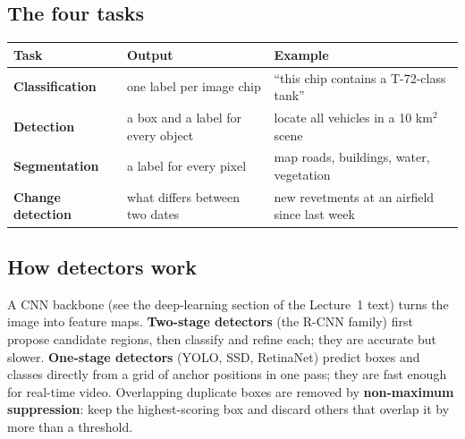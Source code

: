 \documentclass[11pt]{article}
\begin{document}
\subsection{The four tasks}
\begin{center}\small\renewcommand{\arraystretch}{1.3}\begin{tabularx}{\textwidth}{>{\bfseries}l X X}\toprule Task & Output & Example\\\midrule
Classification & one label per image chip & ``this chip contains a T-72-class tank''\\
Detection & a box and a label for every object & locate all vehicles in a 10 km$^2$ scene\\
Segmentation & a label for every pixel & map roads, buildings, water, vegetation\\
Change detection & what differs between two dates & new revetments at an airfield since last week\\\bottomrule\end{tabularx}\end{center}
\subsection{How detectors work}
A CNN backbone (see the deep-learning section of the Lecture~1 text) turns the image into feature maps. \textbf{Two-stage detectors} (the R-CNN family) first propose candidate regions, then classify and refine each; they are accurate but slower. \textbf{One-stage detectors} (YOLO, SSD, RetinaNet) predict boxes and classes directly from a grid of anchor positions in one pass; they are fast enough for real-time video. Overlapping duplicate boxes are removed by \textbf{non-maximum suppression}: keep the highest-scoring box and discard others that overlap it by more than a threshold.
\end{document}
